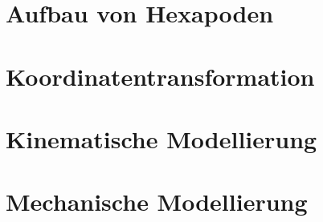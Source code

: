 \section{Aufbau von Hexapoden}
\label{sec:aufbau}

\section{Koordinatentransformation}
\label{sec:transformation}

\section{Kinematische Modellierung}
\label{sec:kinematik}

\section{Mechanische Modellierung}
\label{sec:mechanik}

